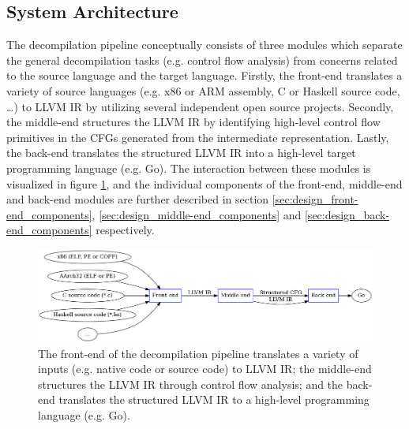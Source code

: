


\subsection{System Architecture}
\label{sec:design_system_architecture}

The decompilation pipeline conceptually consists of three modules which separate the general decompilation tasks (e.g. control flow analysis) from concerns related to the source language and the target language. Firstly, the front-end translates a variety of source languages (e.g. x86 or ARM assembly, C or Haskell source code, …) to LLVM IR by utilizing several independent open source projects. Secondly, the middle-end structures the LLVM IR by identifying high-level control flow primitives in the CFGs generated from the intermediate representation. Lastly, the back-end translates the structured LLVM IR into a high-level target programming language (e.g. Go). The interaction between these modules is visualized in figure \ref{fig:decompilation_pipeline}, and the individual components of the front-end, middle-end and back-end modules are further described in section \ref{sec:design_front-end_components}, \ref{sec:design_middle-end_components} and \ref{sec:design_back-end_components} respectively.

\begin{figure}[htbp]
	\begin{center}
		\includegraphics[width=\textwidth]{inc/decompilation_pipeline.png}
		\caption{The front-end of the decompilation pipeline translates a variety of inputs (e.g. native code or source code) to LLVM IR; the middle-end structures the LLVM IR through control flow analysis; and the back-end translates the structured LLVM IR to a high-level programming language (e.g. Go).}
		\label{fig:decompilation_pipeline}
	\end{center}
\end{figure}

